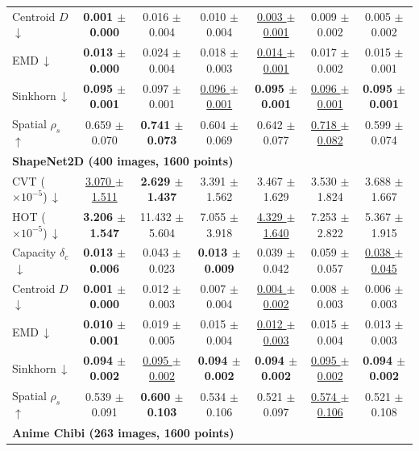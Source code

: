 \begin{table}[b]
\begin{tabular}{|l|c|c|c|c|c|c|}
Centroid $D$\,$\downarrow$ & \textbf{0.001 $\pm$ 0.000} & 0.016 $\pm$ 0.004 & 0.010 $\pm$ 0.004 & \underline{0.003 $\pm$ 0.001} & 0.009 $\pm$ 0.002 & 0.005 $\pm$ 0.002 \\
EMD\,$\downarrow$ & \textbf{0.013 $\pm$ 0.000} & 0.024 $\pm$ 0.004 & 0.018 $\pm$ 0.003 & \underline{0.014 $\pm$ 0.001} & 0.017 $\pm$ 0.002 & 0.015 $\pm$ 0.001 \\
Sinkhorn\,$\downarrow$ & \textbf{0.095 $\pm$ 0.001} & 0.097 $\pm$ 0.001 & \underline{0.096 $\pm$ 0.001} & \textbf{0.095 $\pm$ 0.001} & \underline{0.096 $\pm$ 0.001} & \textbf{0.095 $\pm$ 0.001} \\
Spatial $\rho_s$\,$\uparrow$ & 0.659 $\pm$ 0.070 & \textbf{0.741 $\pm$ 0.073} & 0.604 $\pm$ 0.069 & 0.642 $\pm$ 0.077 & \underline{0.718 $\pm$ 0.082} & 0.599 $\pm$ 0.074 \\
\hline
\multicolumn{7}{|l|}{\textbf{ShapeNet2D (400 images, 1600 points)}} \\
\hline
CVT ($\times 10^{-5}$)\,$\downarrow$ & \underline{3.070 $\pm$ 1.511} & \textbf{2.629 $\pm$ 1.437} & 3.391 $\pm$ 1.562 & 3.467 $\pm$ 1.629 & 3.530 $\pm$ 1.824 & 3.688 $\pm$ 1.667 \\
HOT ($\times 10^{-5}$)\,$\downarrow$ & \textbf{3.206 $\pm$ 1.547} & 11.432 $\pm$ 5.604 & 7.055 $\pm$ 3.918 & \underline{4.329 $\pm$ 1.640} & 7.253 $\pm$ 2.822 & 5.367 $\pm$ 1.915 \\
Capacity $\delta_c$\,$\downarrow$ & \textbf{0.013 $\pm$ 0.006} & 0.043 $\pm$ 0.023 & \textbf{0.013 $\pm$ 0.009} & 0.039 $\pm$ 0.042 & 0.059 $\pm$ 0.057 & \underline{0.038 $\pm$ 0.045} \\
Centroid $D$\,$\downarrow$ & \textbf{0.001 $\pm$ 0.000} & 0.012 $\pm$ 0.003 & 0.007 $\pm$ 0.004 & \underline{0.004 $\pm$ 0.002} & 0.008 $\pm$ 0.003 & 0.006 $\pm$ 0.003 \\
EMD\,$\downarrow$ & \textbf{0.010 $\pm$ 0.001} & 0.019 $\pm$ 0.005 & 0.015 $\pm$ 0.004 & \underline{0.012 $\pm$ 0.003} & 0.015 $\pm$ 0.004 & 0.013 $\pm$ 0.003 \\
Sinkhorn\,$\downarrow$ & \textbf{0.094 $\pm$ 0.002} & \underline{0.095 $\pm$ 0.002} & \textbf{0.094 $\pm$ 0.002} & \textbf{0.094 $\pm$ 0.002} & \underline{0.095 $\pm$ 0.002} & \textbf{0.094 $\pm$ 0.002} \\
Spatial $\rho_s$\,$\uparrow$ & 0.539 $\pm$ 0.091 & \textbf{0.600 $\pm$ 0.103} & 0.534 $\pm$ 0.106 & 0.521 $\pm$ 0.097 & \underline{0.574 $\pm$ 0.106} & 0.521 $\pm$ 0.108 \\
\hline
\multicolumn{7}{|l|}{\textbf{Anime Chibi (263 images, 1600 points)}} \\

\end{tabular}
\end{table}
